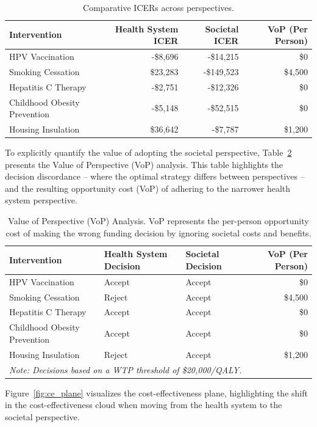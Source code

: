 \documentclass{article}
\begin{document}
\begin{table}[ht]
\centering
\begin{tabular}{lrrr}
\hline
Intervention & Health System ICER & Societal ICER & VoP (Per Person) \\
\hline
HPV Vaccination & -\$8,696 & -\$14,215 & \$0 \\
Smoking Cessation & \$23,283 & -\$149,523 & \$4,500 \\
Hepatitis C Therapy & -\$2,751 & -\$12,326 & \$0 \\
Childhood Obesity Prevention & -\$5,148 & -\$52,515 & \$0 \\
Housing Insulation & \$36,642 & -\$7,787 & \$1,200 \\
\hline
\end{tabular}
\caption{Comparative ICERs across perspectives.}
\label{tab:results}
\end{table}

To explicitly quantify the value of adopting the societal perspective, Table~\ref{tab:vop_analysis} presents the Value of Perspective (VoP) analysis.
This table highlights the decision discordance -- where the optimal strategy differs between perspectives -- and the resulting opportunity cost (VoP) of adhering to the narrower health system perspective.

\begin{table}[ht]
\centering
\begin{tabular}{lllr}
\hline
Intervention & Health System Decision & Societal Decision & VoP (Per Person) \\
\hline
HPV Vaccination & Accept & Accept & \$0 \\
Smoking Cessation & Reject & Accept & \$4,500 \\
Hepatitis C Therapy & Accept & Accept & \$0 \\
Childhood Obesity Prevention & Accept & Accept & \$0 \\
Housing Insulation & Reject & Accept & \$1,200 \\
\hline
\multicolumn{4}{l}{\footnotesize \textit{Note: Decisions based on a WTP threshold of \$20,000/QALY.}} \\
\end{tabular}
\caption{Value of Perspective (VoP) Analysis. VoP represents the per-person opportunity cost of making the wrong funding decision by ignoring societal costs and benefits.}
\label{tab:vop_analysis}
\end{table}

Figure~\ref{fig:ce_plane} visualizes the cost-effectiveness plane, highlighting the shift in the cost-effectiveness cloud when moving from the health system to the societal perspective.
\end{document}
